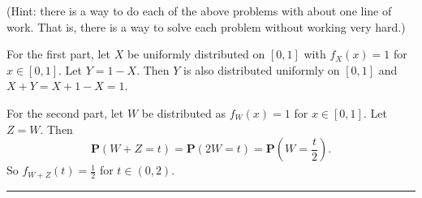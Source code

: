 \documentclass{article}
\theoremstyle{break}
\newenvironment{solution}{{\bf Solution:}}{\hfill\rule{2mm}{2mm}}
\renewcommand{\P}{\mathbf{P}}
\begin{document}
(Hint: there is a way to do each of the above problems with about one line of work.  That is, there is a way to solve each problem without working very hard.)

\begin{solution}
For the first part, let $X$ be uniformly distributed on $[0,1]$ with $f_X(x) = 1$ for $x \in [0,1]$. Let $Y = 1 - X$. Then $Y$ is also distributed uniformly on $[0,1]$ and $X + Y = X + 1 - X = 1$. 

For the second part, let $W$ be distributed as $f_W(x) = 1$ for $x \in [0,1]$. Let $Z = W$. Then 
\[ \P(W + Z = t) = \P(2W = t) = \P\left(W = \frac{t}{2}\right).
\]
So $f_{W+Z}(t) = \frac{1}{2}$ for $t \in (0,2)$.
\begin{comment}
\begin{align*}
f_W(x) &= \P(W = x) \\
	&= \P(2W = 2x) \\
	&= \P(W + Z = 2x)
\end{align*}
\end{comment}
\end{solution}
\end{document}
